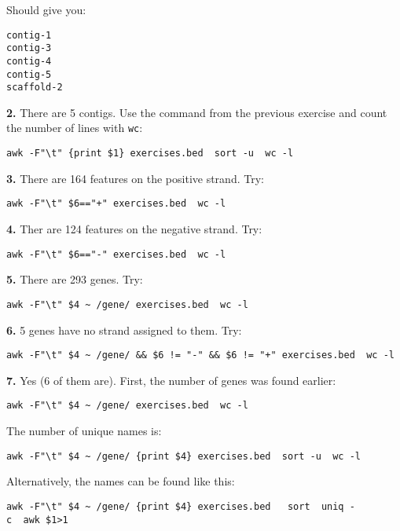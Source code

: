 \documentclass[11pt]{article}
\begin{document}
Should give you:

\begin{verbatim}
contig-1
contig-3
contig-4
contig-5
scaffold-2
\end{verbatim}

\textbf{2.} There are 5 contigs. Use the command from the previous
exercise and count the number of lines with \texttt{wc}:

\texttt{awk\ -F"\textbackslash{}t"\ \textquotesingle{}\{print\ \$1\}\textquotesingle{}\ exercises.bed\ \textbar{}\ sort\ -u\ \textbar{}\ wc\ -l}

\textbf{3.} There are 164 features on the positive strand. Try:

\texttt{awk\ -F"\textbackslash{}t"\ \textquotesingle{}\$6=="+"\textquotesingle{}\ exercises.bed\ \textbar{}\ wc\ -l}

\textbf{4.} Ther are 124 features on the negative strand. Try:

\texttt{awk\ -F"\textbackslash{}t"\ \textquotesingle{}\$6=="-"\textquotesingle{}\ exercises.bed\ \textbar{}\ wc\ -l}

\textbf{5.} There are 293 genes. Try:

\texttt{awk\ -F"\textbackslash{}t"\ \textquotesingle{}\$4\ \textasciitilde{}\ /gene/\textquotesingle{}\ exercises.bed\ \textbar{}\ wc\ -l}

\textbf{6.} 5 genes have no strand assigned to them. Try:

\texttt{awk\ -F"\textbackslash{}t"\ \textquotesingle{}\$4\ \textasciitilde{}\ /gene/\ \&\&\ \$6\ !=\ "-"\ \&\&\ \$6\ !=\ "+"\textquotesingle{}\ exercises.bed\ \textbar{}\ wc\ -l}

\textbf{7.} Yes (6 of them are). First, the number of genes was found
earlier:

\texttt{awk\ -F"\textbackslash{}t"\ \textquotesingle{}\$4\ \textasciitilde{}\ /gene/\textquotesingle{}\ exercises.bed\ \textbar{}\ wc\ -l}

The number of unique names is:

\texttt{awk\ -F"\textbackslash{}t"\ \textquotesingle{}\$4\ \textasciitilde{}\ /gene/\ \{print\ \$4\}\textquotesingle{}\ exercises.bed\ \textbar{}\ sort\ -u\ \textbar{}\ wc\ -l}

Alternatively, the names can be found like this:

\texttt{awk\ -F"\textbackslash{}t"\ \textquotesingle{}\$4\ \textasciitilde{}\ /gene/\ \{print\ \$4\}\textquotesingle{}\ exercises.bed\ \ \textbar{}\ sort\ \textbar{}\ uniq\ -c\ \textbar{}\ awk\ \textquotesingle{}\$1\textgreater{}1\textquotesingle{}}
\end{document}

